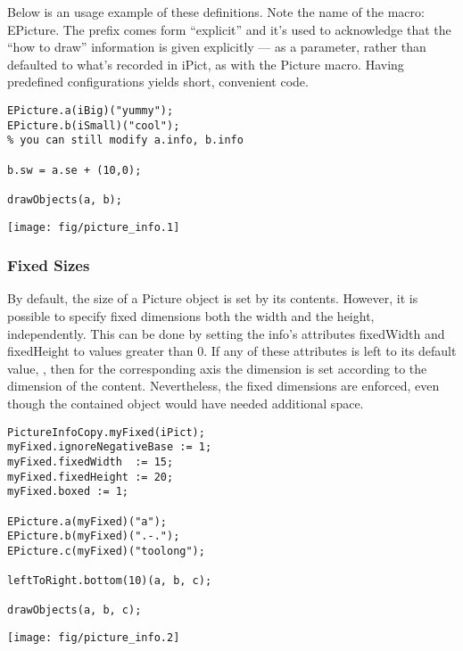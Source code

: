 \documentclass{article}
\newcommand{\code}{\ttfamily}
\begin{document}
Below is an usage example of these definitions. Note the name of the macro: {\code EPicture}.
The prefix comes form ``explicit''  and it's used to acknowledge that the
``how to draw'' information is given explicitly --- as a parameter,
rather than defaulted to what's recorded in {\code iPict}, as with the {\code Picture} macro.
Having predefined configurations yields short, convenient code.

\begin{multicols}{2}
\begin{verbatim}
EPicture.a(iBig)("yummy");
EPicture.b(iSmall)("cool");
% you can still modify a.info, b.info

b.sw = a.se + (10,0);

drawObjects(a, b);
\end{verbatim}
\columnbreak
\hspace{1cm}\texttt{[image: fig/picture\_info.1]}
\end{multicols}

\subsubsection{Fixed Sizes}

By default, the size of a {\code Picture} object is set by its contents. However,
it is possible to specify fixed dimensions both the width and the height, independently.
This can be done by setting the {\code info}'s attributes {\code fixedWidth} and {\code fixedHeight} to values
greater than 0. If any of these attributes is left to its default value, {\code -1}, then for the corresponding
axis the dimension is set according to the dimension of the content. Nevertheless, the fixed dimensions are enforced, even though the contained object would have needed additional space.

\begin{multicols}{2}
\begin{verbatim}
PictureInfoCopy.myFixed(iPict);
myFixed.ignoreNegativeBase := 1;
myFixed.fixedWidth  := 15;
myFixed.fixedHeight := 20;
myFixed.boxed := 1;

EPicture.a(myFixed)("a");
EPicture.b(myFixed)(".-.");
EPicture.c(myFixed)("toolong");

leftToRight.bottom(10)(a, b, c);

drawObjects(a, b, c);
\end{verbatim}
\columnbreak
\hspace{1cm}\texttt{[image: fig/picture\_info.2]}
\end{multicols}
\end{document}
